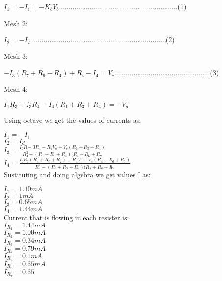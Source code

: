 $I_1=-I_b=-K_bV_b$..............................................................(1)

Mesh 2:

$I_2=-I_d$.......................................................................(2)

Mesh 3:

$-I_3(R_7+R_6+R_4)+R_4-I_4=V_c$..................................................(3)

Mesh 4:

$I_1R_3+I_3R_4-I_4(R_1+R_3+R_4)=-V_a$

Using octave we get the values of currents as:

$I_1=-I_b$\\

$I_2=I_d$\\

$I_3=\frac{I_bR-3R_4-R_4V_a+V_c(R_1+R_3+R_4)}{R_4^2-(R_1+R_3+R_4)(R_4+R_6+R_7}$\\


$I_4=\frac{I_bR_3(R_4+R_6+R_7)+R_4V_c-V_a(R_4+R_6+R_7)}{R_4^2-(R_1+R_3+R_4)(R_4+R_6+R_7}$\\

Sustituting and doing algebra we get values I as:

$I_1=1.10mA$\\
$I_2=1mA$\\
$I_3=0.65mA$\\
$I_4=1.44mA$\\

Current that is flowing in each resister is:\\

$I_{R_1}=1.44mA$\\
$I_{R_2}=1.00mA$\\
$I_{R_3}=0.34mA$\\
$I_{R_4}=0.79mA$\\
$I_{R_5}=0.1mA$\\
$I_{R_6}=0.65mA$\\
$I_{R_7}=0.65$\\


